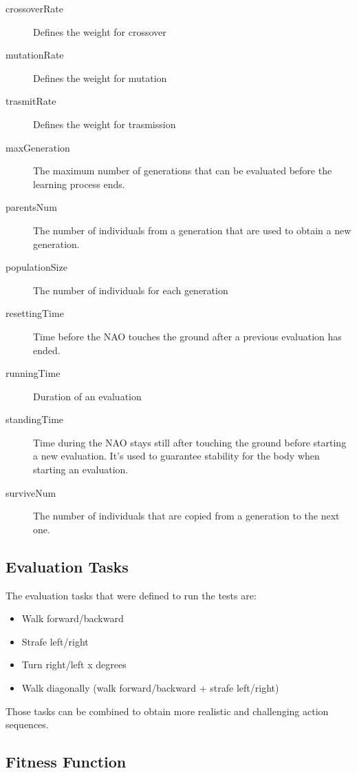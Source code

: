 \documentclass[a4paper, twocolumn]{article}
\begin{document}
\begin{description}
\item[crossoverRate] Defines the weight for crossover
\item[mutationRate] Defines the weight for mutation
\item[trasmitRate] Defines the weight for trasmission
\item[maxGeneration] The maximum number of generations that can be evaluated before the learning process ends. 

\item[parentsNum] The number of individuals from a generation that are used to obtain a new generation.
\item[populationSize] The number of individuals for each generation
\item[resettingTime] Time before the NAO touches the ground after a previous evaluation has ended.
\item[runningTime] Duration of an evaluation
\item[standingTime] Time during the NAO stays still after touching the ground before starting a new evaluation. It's used to guarantee stability for the body when starting an evaluation.
\item[surviveNum] The number of individuals that are copied from a generation to the next one. 

\end{description}

\subsection{Evaluation Tasks}

The evaluation tasks that were defined to run the tests are:

\begin{itemize}
\item Walk forward/backward 
\item Strafe left/right 
\item Turn right/left x degrees 
\item Walk diagonally (walk forward/backward + strafe left/right) 

\end{itemize}

Those tasks can be combined to obtain more realistic and challenging action sequences.

\subsection{Fitness Function}
\end{document}
